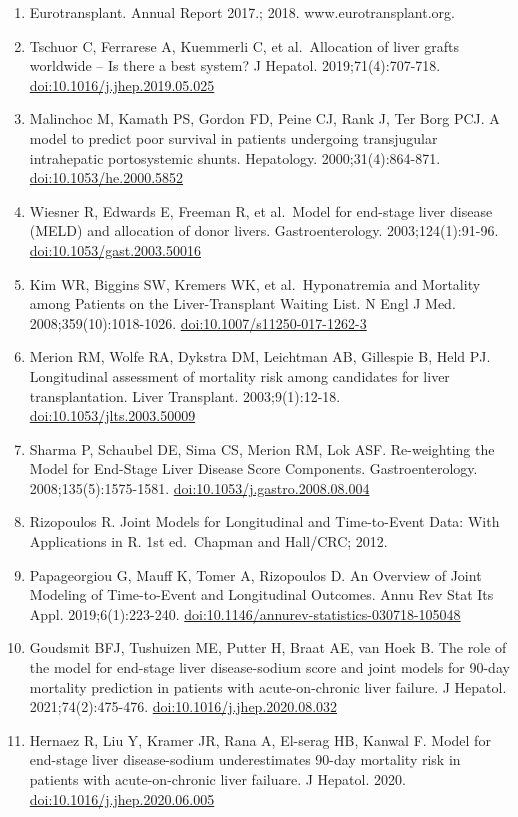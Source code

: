 \documentclass[11pt,english,]{book} %
\providecommand{\tightlist}{%
  \setlength{\itemsep}{0pt}\setlength{\parskip}{0pt}}
\begin{document}
\begin{enumerate}
\def\labelenumi{\arabic{enumi}.}
\tightlist
\item
  Eurotransplant. Annual Report 2017.; 2018. www.eurotransplant.org.
\item
  Tschuor C, Ferrarese A, Kuemmerli C, et al.~Allocation of liver grafts worldwide -- Is there a best system? J Hepatol. 2019;71(4):707-718. \url{doi:10.1016/j.jhep.2019.05.025}
\item
  Malinchoc M, Kamath PS, Gordon FD, Peine CJ, Rank J, Ter Borg PCJ. A model to predict poor survival in patients undergoing transjugular intrahepatic portosystemic shunts. Hepatology. 2000;31(4):864-871. \url{doi:10.1053/he.2000.5852}
\item
  Wiesner R, Edwards E, Freeman R, et al.~Model for end-stage liver disease (MELD) and allocation of donor livers. Gastroenterology. 2003;124(1):91-96. \url{doi:10.1053/gast.2003.50016}
\item
  Kim WR, Biggins SW, Kremers WK, et al.~Hyponatremia and Mortality among Patients on the Liver-Transplant Waiting List. N Engl J Med. 2008;359(10):1018-1026. \url{doi:10.1007/s11250-017-1262-3}
\item
  Merion RM, Wolfe RA, Dykstra DM, Leichtman AB, Gillespie B, Held PJ. Longitudinal assessment of mortality risk among candidates for liver transplantation. Liver Transplant. 2003;9(1):12-18. \url{doi:10.1053/jlts.2003.50009}
\item
  Sharma P, Schaubel DE, Sima CS, Merion RM, Lok ASF. Re-weighting the Model for End-Stage Liver Disease Score Components. Gastroenterology. 2008;135(5):1575-1581. \url{doi:10.1053/j.gastro.2008.08.004}
\item
  Rizopoulos R. Joint Models for Longitudinal and Time-to-Event Data: With Applications in R. 1st ed.~Chapman and Hall/CRC; 2012.
\item
  Papageorgiou G, Mauff K, Tomer A, Rizopoulos D. An Overview of Joint Modeling of Time-to-Event and Longitudinal Outcomes. Annu Rev Stat Its Appl. 2019;6(1):223-240. \url{doi:10.1146/annurev-statistics-030718-105048}
\item
  Goudsmit BFJ, Tushuizen ME, Putter H, Braat AE, van Hoek B. The role of the model for end-stage liver disease-sodium score and joint models for 90-day mortality prediction in patients with acute-on-chronic liver failure. J Hepatol. 2021;74(2):475-476. \url{doi:10.1016/j.jhep.2020.08.032}
\item
  Hernaez R, Liu Y, Kramer JR, Rana A, El-serag HB, Kanwal F. Model for end-stage liver disease-sodium underestimates 90-day mortality risk in patients with acute-on-chronic liver failuare. J Hepatol. 2020. \url{doi:10.1016/j.jhep.2020.06.005}

\end{enumerate}
\end{document}
